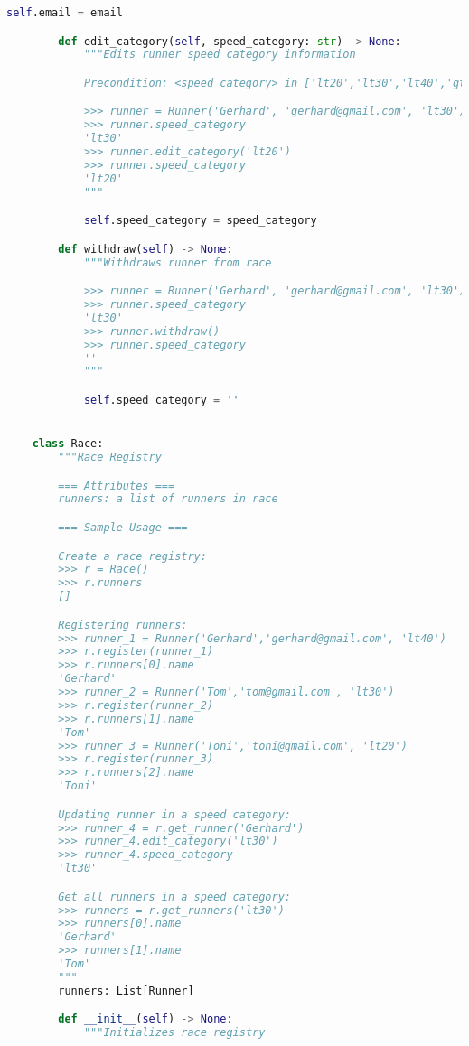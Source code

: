 \documentclass[12pt]{article}
\begin{document}
\begin{lstlisting}[language=Python]
            self.email = email

        def edit_category(self, speed_category: str) -> None:
            """Edits runner speed category information

            Precondition: <speed_category> in ['lt20','lt30','lt40','gt40']

            >>> runner = Runner('Gerhard', 'gerhard@gmail.com', 'lt30')
            >>> runner.speed_category
            'lt30'
            >>> runner.edit_category('lt20')
            >>> runner.speed_category
            'lt20'
            """

            self.speed_category = speed_category

        def withdraw(self) -> None:
            """Withdraws runner from race

            >>> runner = Runner('Gerhard', 'gerhard@gmail.com', 'lt30')
            >>> runner.speed_category
            'lt30'
            >>> runner.withdraw()
            >>> runner.speed_category
            ''
            """

            self.speed_category = ''


    class Race:
        """Race Registry

        === Attributes ===
        runners: a list of runners in race

        === Sample Usage ===

        Create a race registry:
        >>> r = Race()
        >>> r.runners
        []

        Registering runners:
        >>> runner_1 = Runner('Gerhard','gerhard@gmail.com', 'lt40')
        >>> r.register(runner_1)
        >>> r.runners[0].name
        'Gerhard'
        >>> runner_2 = Runner('Tom','tom@gmail.com', 'lt30')
        >>> r.register(runner_2)
        >>> r.runners[1].name
        'Tom'
        >>> runner_3 = Runner('Toni','toni@gmail.com', 'lt20')
        >>> r.register(runner_3)
        >>> r.runners[2].name
        'Toni'

        Updating runner in a speed category:
        >>> runner_4 = r.get_runner('Gerhard')
        >>> runner_4.edit_category('lt30')
        >>> runner_4.speed_category
        'lt30'

        Get all runners in a speed category:
        >>> runners = r.get_runners('lt30')
        >>> runners[0].name
        'Gerhard'
        >>> runners[1].name
        'Tom'
        """
        runners: List[Runner]

        def __init__(self) -> None:
            """Initializes race registry


\end{lstlisting}
\end{document}
